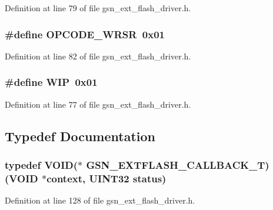 Definition at line 79 of file gsn\_\-ext\_\-flash\_\-driver.h.

\hypertarget{a00496_ae79c88f89c9e30942e5aad16d6c68fec}{
\subsubsection[{OPCODE\_\-WRSR}]{\setlength{\rightskip}{0pt plus 5cm}\#define OPCODE\_\-WRSR~0x01}}
\label{a00496_ae79c88f89c9e30942e5aad16d6c68fec}


Definition at line 82 of file gsn\_\-ext\_\-flash\_\-driver.h.

\hypertarget{a00496_a6c36bc07fc8bb1cfddadb07cc7c11057}{
\subsubsection[{WIP}]{\setlength{\rightskip}{0pt plus 5cm}\#define WIP~0x01}}
\label{a00496_a6c36bc07fc8bb1cfddadb07cc7c11057}


Definition at line 77 of file gsn\_\-ext\_\-flash\_\-driver.h.



\subsection{Typedef Documentation}
\hypertarget{a00496_a501e29be4c0f8b2ab5c186eb8deb8874}{
\subsubsection[{GSN\_\-EXTFLASH\_\-CALLBACK\_\-T}]{\setlength{\rightskip}{0pt plus 5cm}typedef VOID($\ast$ {\bf GSN\_\-EXTFLASH\_\-CALLBACK\_\-T})(VOID $\ast$context, {\bf UINT32} status)}}
\label{a00496_a501e29be4c0f8b2ab5c186eb8deb8874}


Definition at line 128 of file gsn\_\-ext\_\-flash\_\-driver.h.


